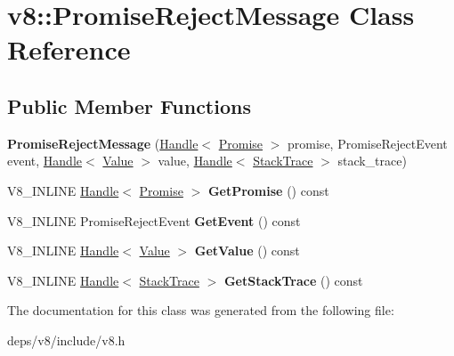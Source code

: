 \hypertarget{classv8_1_1_promise_reject_message}{}\section{v8\+:\+:Promise\+Reject\+Message Class Reference}
\label{classv8_1_1_promise_reject_message}
\subsection*{Public Member Functions}
\begin{DoxyCompactItemize}
\item 
\hypertarget{classv8_1_1_promise_reject_message_adceb7b51206c97c8dc110e455523d7a7}{}{\bfseries Promise\+Reject\+Message} (\hyperlink{classv8_1_1_handle}{Handle}$<$ \hyperlink{classv8_1_1_promise}{Promise} $>$ promise, Promise\+Reject\+Event event, \hyperlink{classv8_1_1_handle}{Handle}$<$ \hyperlink{classv8_1_1_value}{Value} $>$ value, \hyperlink{classv8_1_1_handle}{Handle}$<$ \hyperlink{classv8_1_1_stack_trace}{Stack\+Trace} $>$ stack\+\_\+trace)\label{classv8_1_1_promise_reject_message_adceb7b51206c97c8dc110e455523d7a7}

\item 
\hypertarget{classv8_1_1_promise_reject_message_a4827e57e8e801391fee1fb9ba15219dd}{}V8\+\_\+\+I\+N\+L\+I\+N\+E \hyperlink{classv8_1_1_handle}{Handle}$<$ \hyperlink{classv8_1_1_promise}{Promise} $>$ {\bfseries Get\+Promise} () const \label{classv8_1_1_promise_reject_message_a4827e57e8e801391fee1fb9ba15219dd}

\item 
\hypertarget{classv8_1_1_promise_reject_message_a1380024500dac27eb74665701a80c6b0}{}V8\+\_\+\+I\+N\+L\+I\+N\+E Promise\+Reject\+Event {\bfseries Get\+Event} () const \label{classv8_1_1_promise_reject_message_a1380024500dac27eb74665701a80c6b0}

\item 
\hypertarget{classv8_1_1_promise_reject_message_a6460f7a4939dcbaada74edab060fbeca}{}V8\+\_\+\+I\+N\+L\+I\+N\+E \hyperlink{classv8_1_1_handle}{Handle}$<$ \hyperlink{classv8_1_1_value}{Value} $>$ {\bfseries Get\+Value} () const \label{classv8_1_1_promise_reject_message_a6460f7a4939dcbaada74edab060fbeca}

\item 
\hypertarget{classv8_1_1_promise_reject_message_afe13309811dec50e9de6ca62f05e318e}{}V8\+\_\+\+I\+N\+L\+I\+N\+E \hyperlink{classv8_1_1_handle}{Handle}$<$ \hyperlink{classv8_1_1_stack_trace}{Stack\+Trace} $>$ {\bfseries Get\+Stack\+Trace} () const \label{classv8_1_1_promise_reject_message_afe13309811dec50e9de6ca62f05e318e}

\end{DoxyCompactItemize}


The documentation for this class was generated from the following file\+:\begin{DoxyCompactItemize}
\item 
deps/v8/include/v8.\+h\end{DoxyCompactItemize}
